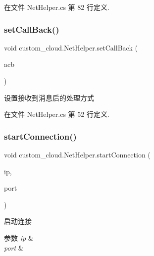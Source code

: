 在文件 Net\+Helper.\+cs 第 82 行定义.

\mbox{\label{classcustom__cloud_1_1_net_helper_ab3ecd4928c1b169fe97e7f3acd61a602}} 
\subsubsection{\texorpdfstring{set\+Call\+Back()}{setCallBack()}}
{\footnotesize\ttfamily void custom\+\_\+cloud.\+Net\+Helper.\+set\+Call\+Back (\begin{DoxyParamCaption}\item[{Async\+Callback}]{acb }\end{DoxyParamCaption})}



设置接收到消息后的处理方式 



在文件 Net\+Helper.\+cs 第 52 行定义.

\mbox{\label{classcustom__cloud_1_1_net_helper_afd7ac9d62a31b4f294abaa213d0c1d4e}} 
\subsubsection{\texorpdfstring{start\+Connection()}{startConnection()}}
{\footnotesize\ttfamily void custom\+\_\+cloud.\+Net\+Helper.\+start\+Connection (\begin{DoxyParamCaption}\item[{string}]{ip,  }\item[{int}]{port }\end{DoxyParamCaption})}



启动连接 


\begin{DoxyParams}{参数}
{\em ip} & \\
\hline
{\em port} & \\
\hline
\end{DoxyParams}


